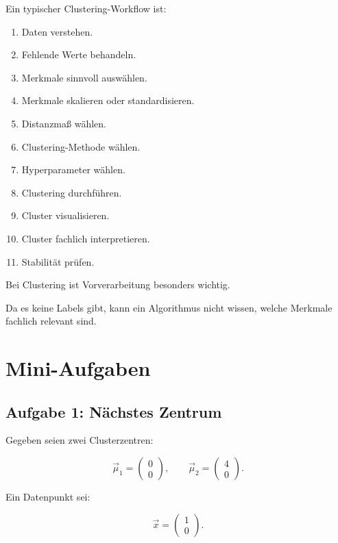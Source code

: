Ein typischer Clustering-Workflow ist:

\begin{enumerate}
    \item Daten verstehen.
    \item Fehlende Werte behandeln.
    \item Merkmale sinnvoll auswählen.
    \item Merkmale skalieren oder standardisieren.
    \item Distanzmaß wählen.
    \item Clustering-Methode wählen.
    \item Hyperparameter wählen.
    \item Clustering durchführen.
    \item Cluster visualisieren.
    \item Cluster fachlich interpretieren.
    \item Stabilität prüfen.
\end{enumerate}

\begin{examtipbox}
Bei Clustering ist Vorverarbeitung besonders wichtig.

Da es keine Labels gibt, kann ein Algorithmus nicht wissen, welche Merkmale fachlich relevant sind.
\end{examtipbox}

\section{Mini-Aufgaben}

\subsection{Aufgabe 1: Nächstes Zentrum}

Gegeben seien zwei Clusterzentren:

\[
    \vec{\mu}_1
    =
    \begin{pmatrix}
        0 \\
        0
    \end{pmatrix},
    \qquad
    \vec{\mu}_2
    =
    \begin{pmatrix}
        4 \\
        0
    \end{pmatrix}.
\]

Ein Datenpunkt sei:

\[
    \vec{x}
    =
    \begin{pmatrix}
        1 \\
        0
    \end{pmatrix}.
\]

